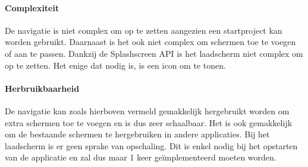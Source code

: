 \paragraph{Complexiteit}
De navigatie is niet complex om op te zetten aangezien een startproject kan worden gebruikt.
Daarnaast is het ook niet complex om schermen toe te voegen of aan te passen.
Dankzij de Splashscreen API is het laadscherm niet complex om op te zetten. 
Het enige dat nodig is, is een icon om te tonen.

\paragraph{Herbruikbaarheid}
De navigatie kan zoals hierboven vermeld gemakkelijk hergebruikt worden om extra schermen 
toe te voegen en is dus zeer schaalbaar.
Het is ook gemakkelijk om de bestaande schermen te hergebruiken in andere applicaties. 
Bij het laadscherm is er geen sprake van opschaling. Dit is enkel nodig bij het opstarten 
van de applicatie en zal dus maar 1 keer geïmplementeerd moeten worden.
